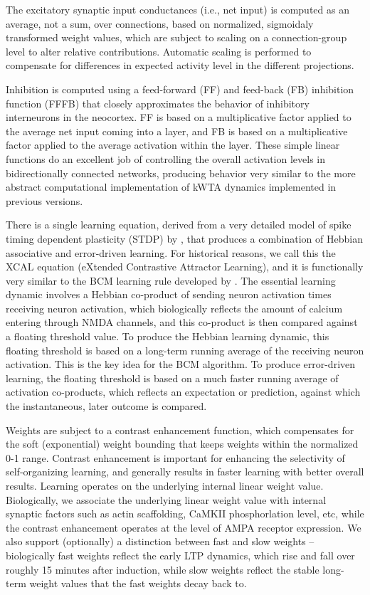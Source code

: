 The excitatory synaptic input conductances (i.e., net input) is computed as an average, not a sum, over connections, based on normalized, sigmoidaly transformed weight values, which are subject to scaling on a connection-group level to alter relative contributions. Automatic scaling is performed to compensate for differences in expected activity level in the different projections.

Inhibition is computed using a feed-forward (FF) and feed-back (FB) inhibition function (FFFB) that closely approximates the behavior of inhibitory interneurons in the neocortex. FF is based on a multiplicative factor applied to the average net input coming into a layer, and FB is based on a multiplicative factor applied to the average activation within the layer. These simple linear functions do an excellent job of controlling the overall activation levels in bidirectionally connected networks, producing behavior very similar to the more abstract computational implementation of kWTA dynamics implemented in previous versions.

There is a single learning equation, derived from a very detailed model of spike timing dependent plasticity (STDP) by , that produces a combination of Hebbian associative and error-driven learning. For historical reasons, we call this the XCAL equation (eXtended Contrastive Attractor Learning), and it is functionally very similar to the BCM learning rule developed by . The essential learning dynamic involves a Hebbian co-product of sending neuron activation times receiving neuron activation, which biologically reflects the amount of calcium entering through NMDA channels, and this co-product is then compared against a floating threshold value. To produce the Hebbian learning dynamic, this floating threshold is based on a long-term running average of the receiving neuron activation. This is the key idea for the BCM algorithm. To produce error-driven learning, the floating threshold is based on a much faster running average of activation co-products, which reflects an expectation or prediction, against which the instantaneous, later outcome is compared.

Weights are subject to a contrast enhancement function, which compensates for the soft (exponential) weight bounding that keeps weights within the normalized 0-1 range. Contrast enhancement is important for enhancing the selectivity of self-organizing learning, and generally results in faster learning with better overall results. Learning operates on the underlying internal linear weight value. Biologically, we associate the underlying linear weight value with internal synaptic factors such as actin scaffolding, CaMKII phosphorlation level, etc, while the contrast enhancement operates at the level of AMPA receptor expression. We also support (optionally) a distinction between fast and slow weights -- biologically fast weights reflect the early LTP dynamics, which rise and fall over roughly 15 minutes after induction, while slow weights reflect the stable long-term weight values that the fast weights decay back to.


